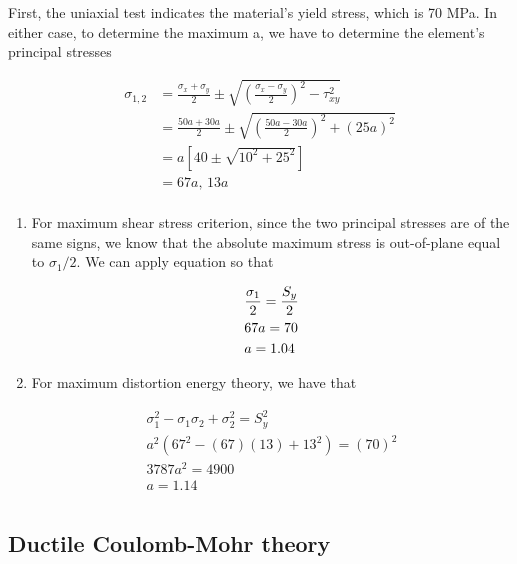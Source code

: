 \documentclass[
10pt,
a4paper,
openany,
svgnames,
]{kaobook} %
\begin{document}
\begin{solution}

  First, the uniaxial test indicates the material’s yield stress, which is 70 MPa. In either case, to determine the maximum a, we have to determine the element’s principal stresses

  \begin{align*}
      \sigma_{1,2} &= \frac{\sigma_x + \sigma_y}{2} \pm \sqrt {\left( \frac{\sigma_x - \sigma_y}{2} \right)^2 - \tau _{xy}^2}  \\ 
                   &= \frac{50a + 30a}{2} \pm \sqrt {\left( \frac{50a - 30a}{2} \right)^2 + (25a)^2}  \\ 
                   &= a\left[ 40 \pm \sqrt {10^2 + 25^2} \right] \\ 
                   &= 67a \text{, } 13a \\ 
  \end{align*}
  
  \begin{enumerate}
  \item For maximum shear stress criterion, since the two principal stresses are of the same signs, we know that the absolute maximum stress is out-of-plane equal to $\sigma_1/2$. We can apply equation so that
    
    \[\begin{gathered}
        \frac{\sigma_1}{2} = \frac{S_y}{2} \hfill \\
        67a = 70 \hfill \\
        a = 1.04 \hfill \\ 
      \end{gathered} \]
    
  \item For maximum distortion energy theory, we have that
    
    \[\begin{gathered}
        \sigma_1^2 -\sigma_1\sigma_2 + \sigma_2^2 = S_y^2 \\ 
        a^2 \left( 67^2 - (67)(13) + 13^2 \right) = (70)^2 \\ 
        3787a^2 = 4900 \\ 
        a = 1.14 \\ 
      \end{gathered} \]
    \end{enumerate}
\end{solution}

\subsection{Ductile Coulomb-Mohr theory}
\end{document}
